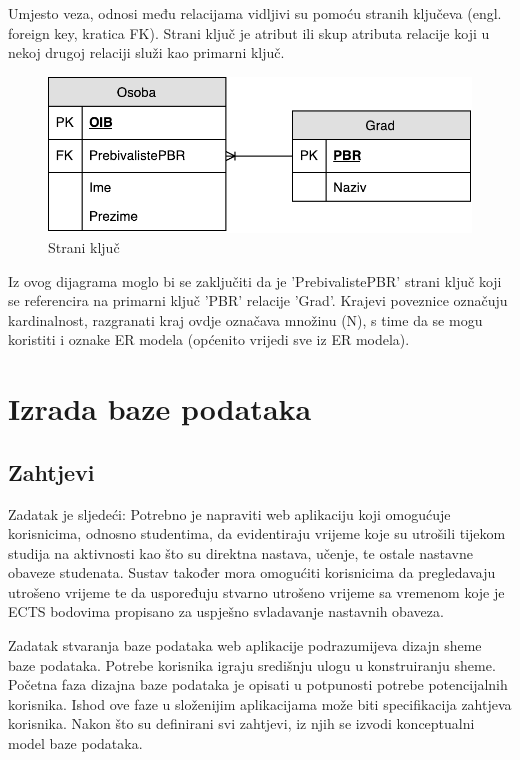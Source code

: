 \documentclass[times, utf8, zavrsni]{fer}
\begin{document}
Umjesto veza, odnosi među relacijama vidljivi su pomoću stranih ključeva (engl. foreign key, kratica FK). Strani ključ je atribut ili skup atributa relacije koji u nekoj drugoj relaciji služi kao primarni ključ.\\

\begin{figure}[H]
\centering
\includegraphics[scale=0.8]{img/strani-kljuc.pdf}
\caption{Strani ključ}
\label{fig:strani-kljuc}
\end{figure}

Iz ovog dijagrama moglo bi se zaključiti da je 'PrebivalistePBR' strani ključ koji se referencira na primarni ključ 'PBR' relacije 'Grad'. Krajevi poveznice označuju kardinalnost, razgranati kraj ovdje označava množinu (N), s time da se mogu koristiti i oznake ER modela (općenito vrijedi sve iz ER modela).
\clearpage
\section{Izrada baze podataka}
\subsection{Zahtjevi}

Zadatak je sljedeći:
Potrebno je napraviti web aplikaciju koji omogućuje korisnicima, odnosno studentima, da evidentiraju vrijeme koje su utrošili tijekom studija na aktivnosti kao što su direktna nastava, učenje, te ostale nastavne obaveze studenata. Sustav također mora omogućiti korisnicima da pregledavaju utrošeno vrijeme te da uspoređuju stvarno utrošeno vrijeme sa vremenom koje je ECTS bodovima propisano za uspješno svladavanje nastavnih obaveza.

Zadatak stvaranja baze podataka web aplikacije podrazumijeva dizajn sheme baze podataka. Potrebe korisnika igraju središnju ulogu u konstruiranju sheme. Početna faza dizajna baze podataka je opisati u potpunosti potrebe potencijalnih korisnika. Ishod ove faze u složenijim aplikacijama može biti specifikacija zahtjeva korisnika. Nakon što su definirani svi zahtjevi, iz njih se izvodi konceptualni model baze podataka.\\
\end{document}
